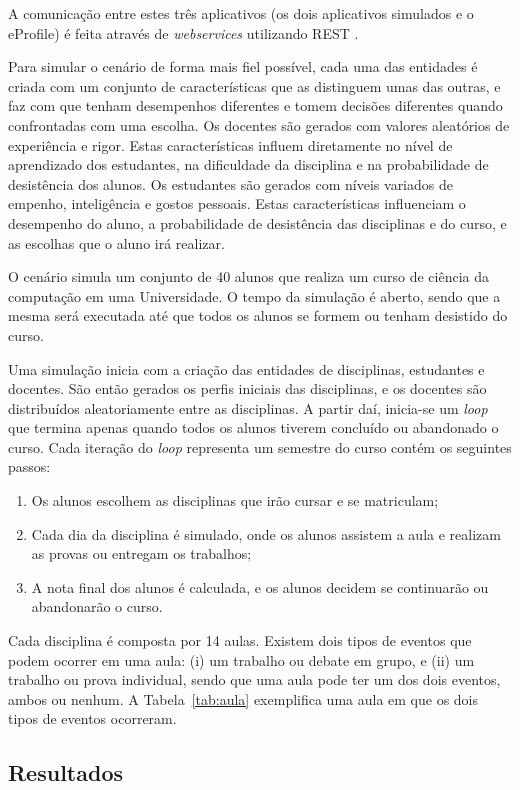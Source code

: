 A comunicação entre estes três aplicativos (os dois aplicativos simulados e o eProfile) é feita através de {\em webservices} utilizando REST \cite{fieldings00}.

Para simular o cenário de forma mais fiel possível, cada uma das entidades é criada com um conjunto de características que as distinguem umas das outras, e faz com que tenham desempenhos diferentes e tomem decisões diferentes quando confrontadas com uma escolha. Os docentes são gerados com valores aleatórios de experiência e rigor. Estas características influem diretamente no nível de aprendizado dos estudantes, na dificuldade da disciplina e na probabilidade de desistência dos alunos. Os estudantes são gerados com níveis variados de empenho, inteligência e gostos pessoais. Estas características influenciam o desempenho do aluno, a probabilidade de desistência das disciplinas e do curso, e as escolhas que o aluno irá realizar.

O cenário simula um conjunto de 40 alunos que realiza um curso de ciência da computação em uma Universidade. O tempo da simulação é aberto, sendo que a mesma será executada até que todos os alunos se formem ou tenham desistido do curso.

Uma simulação inicia com a criação das entidades de disciplinas, estudantes e docentes. São então gerados os perfis iniciais das disciplinas, e os docentes são distribuídos aleatoriamente entre as disciplinas. A partir daí, inicia-se um {\em loop} que termina apenas quando todos os alunos tiverem concluído ou abandonado o curso. Cada iteração do {\em loop} representa um semestre do curso contém os seguintes passos:

\begin{enumerate}
  \item Os alunos escolhem as disciplinas que irão cursar e se matriculam;
  \item Cada dia da disciplina é simulado, onde os alunos assistem a aula e realizam as provas ou entregam os trabalhos;
  \item A nota final dos alunos é calculada, e os alunos decidem se continuarão ou abandonarão o curso.
\end{enumerate}

Cada disciplina é composta por 14 aulas. Existem dois tipos de eventos que podem ocorrer em uma aula: (i) um trabalho ou debate em grupo, e (ii) um trabalho ou prova individual, sendo que uma aula pode ter um dos dois eventos, ambos ou nenhum. A Tabela~\ref{tab:aula} exemplifica uma aula em que os dois tipos de eventos ocorreram.


\subsection{Resultados}
\label{sec:resultados_cen1}

